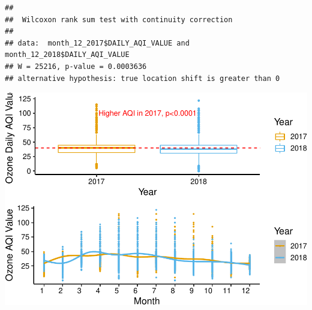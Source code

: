 \documentclass[12pt,]{article}
\newenvironment{Shaded}{\begin{snugshade}}{\end{snugshade}}
\newcommand{\KeywordTok}[1]{\textcolor[rgb]{0.13,0.29,0.53}{\textbf{#1}}}
\newcommand{\DataTypeTok}[1]{\textcolor[rgb]{0.13,0.29,0.53}{#1}}
\newcommand{\DecValTok}[1]{\textcolor[rgb]{0.00,0.00,0.81}{#1}}
\newcommand{\StringTok}[1]{\textcolor[rgb]{0.31,0.60,0.02}{#1}}
\newcommand{\OperatorTok}[1]{\textcolor[rgb]{0.81,0.36,0.00}{\textbf{#1}}}
\newcommand{\NormalTok}[1]{#1}
\begin{document}
\begin{Shaded}
\end{Shaded}

\begin{verbatim}
## 
##  Wilcoxon rank sum test with continuity correction
## 
## data:  month_12_2017$DAILY_AQI_VALUE and month_12_2018$DAILY_AQI_VALUE
## W = 25216, p-value = 0.0003636
## alternative hypothesis: true location shift is greater than 0
\end{verbatim}

\includegraphics{Xia_ENV_872_Project_files/figure-latex/Final visualization 1-1.pdf}
\pagebreak
\end{document}

